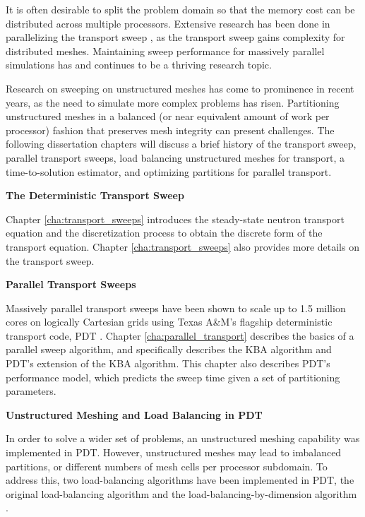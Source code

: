 {It is often desirable to split the problem domain so that the memory cost can be distributed across multiple processors.
Extensive research has been done in parallelizing the transport sweep \cite{KBA,partisn,denovo,mpadams2013,mpadams2015}, as the transport sweep gains complexity for distributed meshes. Maintaining sweep performance for massively parallel simulations has and continues to be a thriving research topic.

Research on sweeping on unstructured meshes has come to prominence in recent years, as the need to simulate more complex problems has risen.
Partitioning unstructured meshes in a balanced (or near equivalent amount of work per processor) fashion that preserves mesh integrity can present challenges.
The following dissertation chapters will discuss a brief history of the transport sweep, parallel transport sweeps, load balancing unstructured meshes for transport, a time-to-solution estimator, and optimizing partitions for parallel transport.

\noindent \textbf{The Deterministic Transport Sweep}

Chapter \ref{cha:transport_sweeps} introduces the steady-state neutron transport equation and the discretization process to obtain the discrete form of the transport equation. Chapter \ref{cha:transport_sweeps} also provides more details on the transport sweep.

\noindent \textbf{Parallel Transport Sweeps}

Massively parallel transport sweeps have been shown to scale up to 1.5 million cores on logically Cartesian grids using Texas A\&M's flagship deterministic transport code, PDT \cite{mpadams2013,mpadams2015}.
Chapter \ref{cha:parallel_transport} describes the basics of a parallel sweep algorithm, and specifically describes the KBA algorithm \cite{KBA} and PDT's extension of the KBA algorithm.
This chapter also describes PDT's performance model, which predicts the sweep time given a set of partitioning parameters.

\noindent \textbf{Unstructured Meshing and Load Balancing in PDT}

In order to solve a wider set of problems, an unstructured meshing capability was implemented in PDT.
However, unstructured meshes may lead to imbalanced partitions, or different numbers of mesh cells per processor subdomain.
To address this, two load-balancing algorithms have been implemented in PDT, the original load-balancing algorithm and the load-balancing-by-dimension algorithm \cite{mastersthesis,mc2017}.

}
